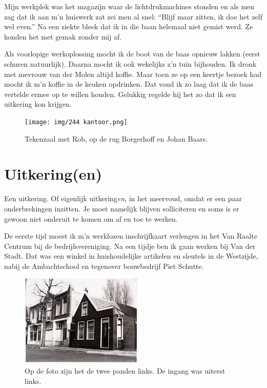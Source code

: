 \documentclass[10pt,twoside, openright]{memoir}
\begin{document}
Mijn werkplek was het magazijn waar de lichtdrukmachines stonden en als men zag dat ik aan m'n huiswerk zat zei men al snel: ``Blijf maar zitten, ik doe het zelf wel even.'' Na een ziekte bleek dat ik in die baan helemaal niet gemist werd. Ze konden het met gemak zonder mij af.

Als voorlopige werkoplossing mocht ik de boot van de baas opnieuw lakken (eerst schuren natuurlijk). Daarna mocht ik ook wekelijks z’n tuin bijhouden. Ik dronk met mevrouw van der Molen altijd koffie. Maar toen ze op een keertje bezoek had mocht ik m’n koffie in de keuken opdrinken. Dat vond ik zo laag dat ik de baas vertelde ermee op te willen houden. Gelukkig regelde hij het zo dat ik een uitkering kon krijgen. 

\begin{figure}[t]
\texttt{[image: img/244 kantoor.png]}
\caption*{\footnotesize Tekenzaal met Rob, op de rug Borgerhoff en Johan Baars.}
\end{figure}

\section{Uitkering(en)} %
\label{cha:uitkering_en}

Een uitkering. Of eigenlijk uitkering\emph{en}, in het meervoud, omdat er een paar onderbrekingen inzitten. Je moet namelijk blijven solliciteren en soms is er gewoon niet onderuit te komen om af en toe te werken. 

De eerste tijd moest ik m'n werklozen inschrijfkaart verlengen in het Van Raalte Centrum bij de bedrijfsvereniging. Na een tijdje ben ik gaan werken bij Van der Stadt. Dat was een winkel in huishoudelijke artikelen en sleutels in de Westzijde, nabij de Ambachtschool en tegenover bouwbedrijf Piet Schutte.

\begin{figure}
\includegraphics[width=\textwidth]{img/ch41/stadt}
\caption*{\footnotesize Op de foto zijn het de twee panden links. De ingang was uiterst links.}
\end{figure}
\end{document}
